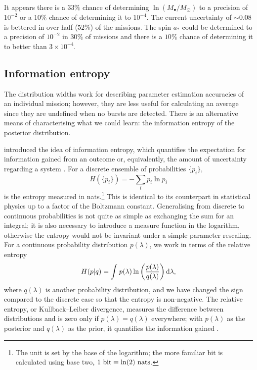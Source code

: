 It appears there is a $33\%$ chance of determining $\ln (M_\bullet/M_\odot)$ to a precision of $10^{-2}$ or a $10\%$ chance of determining it to $10^{-4}$. The current uncertainty of $\sim 0.08$ is bettered in over half ($52\%$) of the missions. The spin $a_\ast$ could be determined to a precision of $10^{-2}$ in $30\%$ of missions and there is a $10\%$ chance of determining it to better than $3\times 10^{-4}$.

\subsection{Information entropy}

The distribution widths work for describing parameter estimation accuracies of an individual mission; however, they are less useful for calculating an average since they are undefined when no bursts are detected. There is an alternative means of characterising what we could learn: the information entropy of the posterior distribution.

\citet{Shannon1948,Shannon1948a} introduced the idea of information entropy, which quantifies the expectation for information gained from an outcome or, equivalently, the amount of uncertainty regarding a system \citep[chapters 2 and 4]{MacKay2003}. For a discrete ensemble of probabilities $\{p_i\}$,
\begin{equation}
H(\{p_i\}) = -\sum_i p_i \ln p_i
\end{equation}
is the entropy measured in nats.\footnote{The unit is set by the base of the logarithm; the more familiar bit is calculated using base two, $1~\mathrm{bit} \equiv \ln(2)~\mathrm{nats}$.} This is identical to its counterpart in statistical physics up to a factor of the Boltzmann constant. Generalising from discrete to continuous probabilities is not quite as simple as exchanging the sum for an integral; it is also necessary to introduce a measure function in the logarithm, otherwise the entropy would not be invariant under a simple parameter rescaling. For a continuous probability distribution $p(\lambda)$, we work in terms of the relative entropy \citep[section 1.4]{Ihara1993}
\begin{equation}
H(p|q) = \int_{}^{}{p(\lambda)\ln\left(\dfrac{p(\lambda)}{q(\lambda)}\right)}\,\mathrm{d}{\lambda},
\end{equation}
where $q(\lambda)$ is another probability distribution, and we have changed the sign compared to the discrete case so that the entropy is non-negative. The relative entropy, or Kullback--Leiber divergence, measures the difference between distributions and is zero only if $p(\lambda) = q(\lambda)$ everywhere; with $p(\lambda)$ as the posterior and $q(\lambda)$ as the prior, it quantifies the information gained \citep{Kullback1951}.

